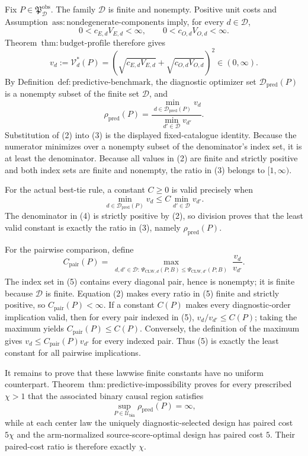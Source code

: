 Fix \(P\in\mathfrak P_{\mathcal D}^{\mathrm{obs}}\).  The family \(\mathcal D\) is finite and nonempty.  Positive unit costs and Assumption~\(\mathrm{ass{:}nondegenerate\text{-}components}\) imply, for every \(d\in\mathcal D\),
\[
 0<c_{E,d}V_{E,d}<\infty,
 \qquad
 0<c_{O,d}V_{O,d}<\infty.
 \tag{1}
\]
Theorem~\(\mathrm{thm{:}budget\text{-}profile}\) therefore gives
\[
 v_d:=\mathcal V_d^*(P)
 =\left(\sqrt{c_{E,d}V_{E,d}}
       +\sqrt{c_{O,d}V_{O,d}}\right)^2
 \in(0,\infty).
 \tag{2}
\]
By Definition~\(\mathrm{def{:}predictive\text{-}benchmark}\), the diagnostic optimizer set \(\mathcal D_{\mathrm{pred}}(P)\) is a nonempty subset of the finite set \(\mathcal D\), and
\[
 \rho_{\mathrm{pred}}(P)
 =\frac{\min_{d\in\mathcal D_{\mathrm{pred}}(P)}v_d}
        {\min_{d'\in\mathcal D}v_{d'}}.
 \tag{3}
\]
Substitution of (2) into (3) is the displayed fixed-catalogue identity.  Because the numerator minimizes over a nonempty subset of the denominator's index set, it is at least the denominator.  Because all values in (2) are finite and strictly positive and both index sets are finite and nonempty, the ratio in (3) belongs to \([1,\infty)\).

For the actual best-tie rule, a constant \(C\ge0\) is valid precisely when
\[
 \min_{d\in\mathcal D_{\mathrm{pred}}(P)}v_d
 \le C\min_{d'\in\mathcal D}v_{d'}.
 \tag{4}
\]
The denominator in (4) is strictly positive by (2), so division proves that the least valid constant is exactly the ratio in (3), namely \(\rho_{\mathrm{pred}}(P)\).

For the pairwise comparison, define
\[
 C_{\mathrm{pair}}(P)
 =\max_{\substack{d,d'\in\mathcal D:\,
 \Psi_{\mathrm{CLW},d}(P;B)
 \le\Psi_{\mathrm{CLW},d'}(P;B)}}
 \frac{v_d}{v_{d'}}.
 \tag{5}
\]
The index set in (5) contains every diagonal pair, hence is nonempty; it is finite because \(\mathcal D\) is finite.  Equation (2) makes every ratio in (5) finite and strictly positive, so \(C_{\mathrm{pair}}(P)<\infty\).  If a constant \(C(P)\) makes every diagnostic-order implication valid, then for every pair indexed in (5), \(v_d/v_{d'}\le C(P)\); taking the maximum yields \(C_{\mathrm{pair}}(P)\le C(P)\).  Conversely, the definition of the maximum gives \(v_d\le C_{\mathrm{pair}}(P)v_{d'}\) for every indexed pair.  Thus (5) is exactly the least constant for all pairwise implications.

It remains to prove that these lawwise finite constants have no uniform counterpart.  Theorem~\(\mathrm{thm{:}predictive\text{-}impossibility}\) proves for every prescribed \(\chi>1\) that the associated binary causal region satisfies
\[
 \sup_{P\in\mathcal U_{\mathrm{bin}}}
 \rho_{\mathrm{pred}}(P)=\infty,
 \tag{6}
\]
while at each center law the uniquely diagnostic-selected design has paired cost \(5\chi\) and the arm-normalized source-score-optimal design has paired cost \(5\).  Their paired-cost ratio is therefore exactly \(\chi\).

